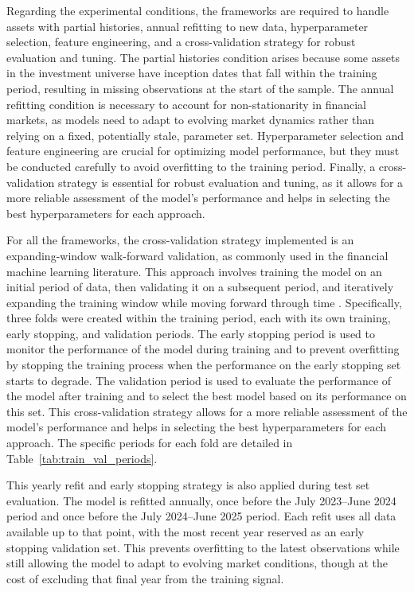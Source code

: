 Regarding the experimental conditions, the frameworks are required to handle assets with partial histories, annual refitting to new data, hyperparameter selection, feature engineering, and a cross-validation strategy for robust evaluation and tuning. The partial histories condition arises because some assets in the investment universe have inception dates that fall within the training period, resulting in missing observations at the start of the sample. The annual refitting condition is necessary to account for non-stationarity in financial markets, as models need to adapt to evolving market dynamics rather than relying on a fixed, potentially stale, parameter set. Hyperparameter selection and feature engineering are crucial for optimizing model performance, but they must be conducted carefully to avoid overfitting to the training period. Finally, a cross-validation strategy is essential for robust evaluation and tuning, as it allows for a more reliable assessment of the model's performance and helps in selecting the best hyperparameters for each approach.

For all the frameworks, the cross-validation strategy implemented is an expanding-window walk-forward validation, as commonly used in the financial machine learning literature. This approach involves training the model on an initial period of data, then validating it on a subsequent period, and iteratively expanding the training window while moving forward through time \cite{0df79, lopezdeprado2018afml_ch1}. Specifically, three folds were created within the training period, each with its own training, early stopping, and validation periods. The early stopping period is used to monitor the performance of the model during training and to prevent overfitting by stopping the training process when the performance on the early stopping set starts to degrade. The validation period is used to evaluate the performance of the model after training and to select the best model based on its performance on this set. This cross-validation strategy allows for a more reliable assessment of the model's performance and helps in selecting the best hyperparameters for each approach. The specific periods for each fold are detailed in Table~\ref{tab:train_val_periods}.

This yearly refit and early stopping strategy is also applied during test set evaluation. The model is refitted annually, once before the July 2023--June 2024 period and once before the July 2024--June 2025 period. Each refit uses all data available up to that point, with the most recent year reserved as an early stopping validation set. This prevents overfitting to the latest observations while still allowing the model to adapt to evolving market conditions, though at the cost of excluding that final year from the training signal.

